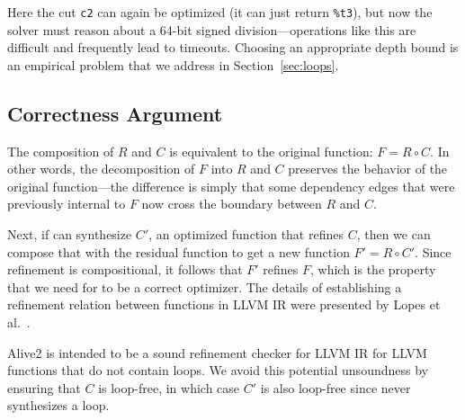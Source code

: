 Here the cut \texttt{c2} can again be optimized (it can just return
\texttt{\%t3}), but now the solver must reason about a 64-bit signed
division---operations like this are difficult and frequently lead to
timeouts.
%
Choosing an appropriate depth bound is an empirical problem that
we address in Section~\ref{sec:loops}.


\subsection{Correctness Argument}

The composition of $R$ and $C$ is equivalent to the original function:
$F = R \circ C$.
%
In other words, the decomposition of $F$ into $R$ and $C$ preserves
the behavior of the original function---the difference is simply that
some dependency edges that were previously internal to $F$ now cross
the boundary between $R$ and $C$.


Next, if \minotaur{} can synthesize $C'$, an optimized function that
refines $C$, then we can compose that with the residual function to
get a new function $F' = R \circ C'$.
%
Since refinement is compositional, it follows that $F'$ refines $F$,
which is the property that we need for \minotaur{} to be a correct
optimizer.
%
The details of establishing a refinement relation between functions in
LLVM IR were presented by Lopes et al.~\cite{alive2}.


Alive2 is intended to be a sound refinement checker for LLVM
IR for LLVM functions that do not contain loops.
%
We avoid this potential unsoundness by ensuring that $C$ is loop-free,
in which case $C'$ is also loop-free since \minotaur{} never synthesizes a
loop.



